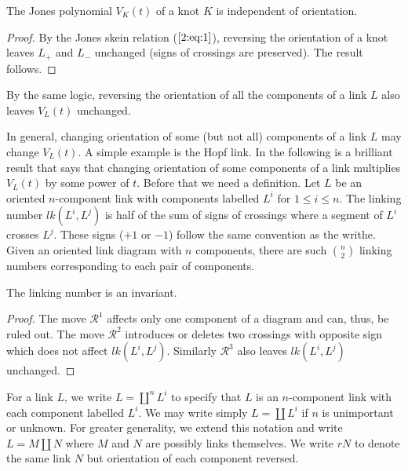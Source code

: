\begin{proposition}
  \label{cha:jones-polynomial-13}
  The Jones polynomial $V_K(t)$ of a knot $K$ is independent of orientation.
\end{proposition}

\begin{proof}
\label{cha:jones-polynomial-14}
By the Jones skein relation ($\ref{2:eq:1}$), reversing the orientation of a knot leaves $L_+$ and $L_-$ unchanged (signs of crossings are preserved). The result follows.
\end{proof}

\begin{remark}
\label{cha:jones-polynomial-15}
By the same logic, reversing the orientation of all the components of a link $L$ also leaves $V_L(t)$ unchanged.
\end{remark}

In general, changing orientation of some (but not all) components of a link $L$ may change $V_L(t)$. A simple example is the Hopf link. In the following is a brilliant result that says that changing orientation of some components of a link multiplies $V_L(t)$ by some power of $t$. Before that we need a definition. Let $L$ be an oriented $n$-component link with components labelled $L^i$ for $1 \leq i \leq n$. The linking number $lk(L^i, L^j)$ is half of the sum of signs of crossings where a segment of $L^i$ crosses $L^j$. These signs ($+1$ or $-1$) follow the same convention as the writhe. Given an oriented link diagram with $n$ components, there are such $\binom{n}{2}$ linking numbers corresponding to each pair of components.

\begin{proposition}
\label{cha:jones-polynomial-16}
The linking number is an invariant.
\end{proposition}

\begin{proof}
The move $\mathcal{R}^1$ affects only one component of a diagram and can, thus, be ruled out. The move $\mathcal{R}^2$ introduces or deletes two crossings with opposite sign which does not affect $lk(L^i, L^j)$. Similarly $\mathcal{R}^3$ also leaves $lk(L^i, L^j)$ unchanged.
\end{proof}

For a link $L$, we write $L = \coprod^n L^i$ to specify that $L$ is an $n$-component link with each component labelled $L^i$. We may write simply $L = \coprod L^i$ if $n$ is unimportant or unknown. For greater generality, we extend this notation and write $L = M\coprod N$ where $M$ and $N$ are possibly links themselves. We write $rN$ to denote the same link $N$ but orientation of each component reversed.

